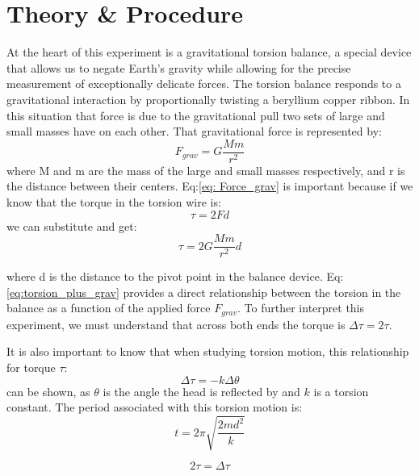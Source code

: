 \documentclass[a4paper,12pt,english]{all-in-one} %
\begin{document}
\section*{Theory \& Procedure}
{
At the heart of this experiment is a gravitational torsion balance, a special device that allows us to negate Earth's gravity while allowing for the precise measurement of exceptionally delicate forces. The torsion balance responds to a gravitational interaction by proportionally twisting a beryllium copper ribbon. In this situation that force is due to the gravitational pull two sets of large and small masses have on each other. That gravitational force is represented by:
\begin{equation}\label{eq: Force_grav}
    F_{grav} = G\frac{Mm}{r^2}
\end{equation}
where M and m are the mass of the large and small masses respectively, and
r is the distance between their centers. Eq:\eqref{eq: Force_grav} is important because if we know that the torque in the torsion wire is:
\begin{equation}\label{eq:torsion}
    \tau = 2Fd
\end{equation}
we can substitute and get:
\begin{equation}\label{eq:torsion_plus_grav}
    \tau = 2G\frac{Mm}{r^2}d
\end{equation}

where d is the distance to the pivot point in the balance device. Eq:\eqref {eq:torsion_plus_grav} provides a direct relationship between the torsion in the balance as a function of the applied force $F_{grav}$. To further interpret this experiment, we must understand that across both ends the torque is $\Delta\tau = 2\tau$.

It is also important to know that when studying torsion motion, this relationship for torque $\tau$:
\begin{equation}\label{eq:change_in_torque}
    \Delta\tau = -k\Delta\theta 
\end{equation}
can be shown, as $\theta$ is the angle the head is reflected by and $k$ is a torsion constant. The period associated with this torsion motion is:
\begin{equation}\label{eq:toursion_perios}
    t = 2\pi\sqrt{\frac{2md^2}{k}}
\end{equation}

\begin{equation}\label{eq:toursion_perios}
    2\tau = \Delta\tau
\end{equation}

}
\end{document}
